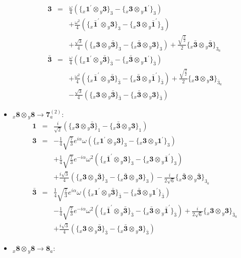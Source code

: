 \documentclass[english]{article}
\newcommand{\rep}[1]{\mathbf{#1}}
\newcommand{\repx}[2]{{}_{#2}\mathbf{#1}}
\newcommand{\subcg}[3]{\big\{ \repx{#1}{x}\otimes\repx{#2}{y}\big\}^{}_{#3}}
\begin{document}
\begin{itemize}
\begin{eqnarray*}
\\
\rep{3} &=& \frac{\omega }{4}\left(\subcg{1^{\prime}}{3}{3}-\subcg{3}{1^{\prime}}{3}\right) \\ 
 & & +\frac{\omega ^2}{4}\left(\subcg{\bar{1}^{\prime}}{3}{3}-\subcg{3}{\bar{1}^{\prime}}{3}\right) \\ 
 & & +\frac{\sqrt{3}}{4}\left(\subcg{3}{\bar{3}}{3}-\subcg{\bar{3}}{3}{3}\right)+\frac{\sqrt{\frac{3}{2}}}{2}\subcg{\bar{3}}{\bar{3}}{3_{a}}
\\
\rep{\bar{3}} &=& \frac{\omega }{4}\left(\subcg{1^{\prime}}{\bar{3}}{\bar{3}}-\subcg{\bar{3}}{1^{\prime}}{\bar{3}}\right) \\ 
 & & +\frac{\omega ^2}{4}\left(\subcg{\bar{1}^{\prime}}{\bar{3}}{\bar{3}}-\subcg{\bar{3}}{\bar{1}^{\prime}}{\bar{3}}\right)+\frac{\sqrt{\frac{3}{2}}}{2}\subcg{3}{3}{\bar{3}_{a}} \\ 
 & & -\frac{\sqrt{3}}{4}\left(\subcg{3}{\bar{3}}{\bar{3}}-\subcg{\bar{3}}{3}{\bar{3}}\right)
\end{eqnarray*}
\item $\repx{8}{x}\otimes\repx{8}{y}\to\rep{7}_{a}^{(2)}$:
\begin{eqnarray*}
\rep{1} &=& \frac{i}{\sqrt{2}}\left(\subcg{3}{\bar{3}}{1}-\subcg{\bar{3}}{3}{1}\right)
\\
\rep{3} &=& -\frac{1}{4} \sqrt{\frac{7}{3}} e^{i \alpha } \omega\left(\subcg{1^{\prime}}{3}{3}-\subcg{3}{1^{\prime}}{3}\right) \\ 
 & & +\frac{1}{4} \sqrt{\frac{7}{3}} e^{-i \alpha } \omega ^2\left(\subcg{\bar{1}^{\prime}}{3}{3}-\subcg{3}{\bar{1}^{\prime}}{3}\right) \\ 
 & & +\frac{i \sqrt{3}}{4}\left(\subcg{3}{\bar{3}}{3}-\subcg{\bar{3}}{3}{3}\right)-\frac{i}{2 \sqrt{6}}\subcg{\bar{3}}{\bar{3}}{3_{a}}
\\
\rep{\bar{3}} &=& \frac{1}{4} \sqrt{\frac{7}{3}} e^{i \alpha } \omega\left(\subcg{1^{\prime}}{\bar{3}}{\bar{3}}-\subcg{\bar{3}}{1^{\prime}}{\bar{3}}\right) \\ 
 & & -\frac{1}{4} \sqrt{\frac{7}{3}} e^{-i \alpha } \omega ^2\left(\subcg{\bar{1}^{\prime}}{\bar{3}}{\bar{3}}-\subcg{\bar{3}}{\bar{1}^{\prime}}{\bar{3}}\right)+\frac{i}{2 \sqrt{6}}\subcg{3}{3}{\bar{3}_{a}} \\ 
 & & +\frac{i \sqrt{3}}{4}\left(\subcg{3}{\bar{3}}{\bar{3}}-\subcg{\bar{3}}{3}{\bar{3}}\right)
\end{eqnarray*}
\item $\repx{8}{x}\otimes\repx{8}{y}\to\rep{8}_{a}$:
\begin{eqnarray*}

\end{eqnarray*}
\end{itemize}
\end{document}
